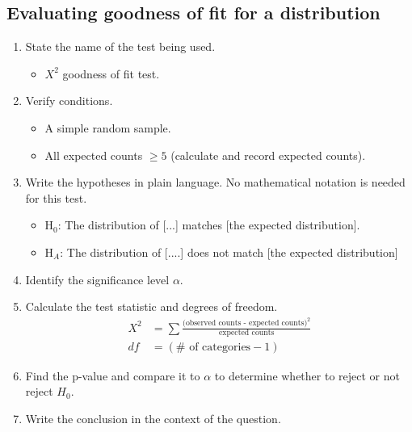 \subsection{Evaluating goodness of fit for a distribution}

\begin{termBox}{
\begin{enumerate}
\setlength{\itemsep}{0mm}
\item State the name of the test being used.\vspace{-1.5mm}
\begin{itemize}
\setlength{\itemsep}{0mm}
\item $X^2$ goodness of fit test.
\end{itemize}
\item Verify conditions.\vspace{-1.5mm}
\begin{itemize}
\setlength{\itemsep}{0mm}
\item A simple random sample.
\item All expected counts $\ge 5$ (calculate and record expected counts).
\end{itemize}
\item Write the hypotheses in plain language. No mathematical notation is needed for this test.\vspace{-1.5mm}
\begin{itemize}
\setlength{\itemsep}{0mm}
\item H$_0$: The distribution of [...] matches [the expected distribution].
\item H$_A$: The distribution of [....] does not match [the expected distribution]
\end{itemize}
\item Identify the significance level $\alpha$.
\item Calculate the test statistic and degrees of freedom.\vspace{-2mm}
\begin{align*}
X^2 &= \sum{\frac{\text{(observed counts - expected counts)}^2}{\text{expected counts}}} \\
df &= (\# \text{ of categories} - 1)
\end{align*}
\item Find the p-value and compare it to $\alpha$ to determine whether to reject or not reject $H_0$.
\item Write the conclusion in the context of the question.
\end{enumerate}}
\end{termBox}

